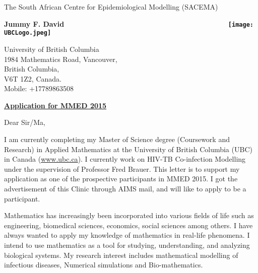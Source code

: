 \documentclass{letter} %
\begin{document}
\signature{Jummy Funke David \href{mailto: jummy@aims.ac.za}{jummy@aims.ac.za} }           %
\longindentation=0pt                       %
\let\raggedleft\raggedright                %
 
\begin{letter}{The South African Centre for Epidemiological Modelling (SACEMA)}

\begin{flushleft}
{\large\bf Jummy F. David $\qquad \qquad \qquad \qquad \qquad \qquad \qquad \qquad \qquad \qquad \qquad \  \ \  \ ${\texttt{[image: UBCLogo.jpeg]}}}
\end{flushleft}

\begin{flushright}
\hfill University of British Columbia\\
\hfill 1984 Mathematics Road, Vancouver,\\
\hfill British Columbia,\\
\hfill V6T 1Z2, Canada.\\
\hfill Mobile: +17789863508
\end{flushright} 
\vfill %
 
\opening{} 

\begin{center}
{\bf{\underline{Application for MMED 2015}}}
\end{center}
Dear Sir/Ma,

\noindent I am currently completing my Master of Science degree (Coursework and Research) in Applied Mathematics at the University of British Columbia (UBC) in Canada (\href{http://www.ubc.ca}{www.ubc.ca}). I currently work on HIV-TB Co-infection Modelling under the supervision of Professor Fred Brauer. This letter is to support my application as one of the prospective participants in MMED 2015. I got the advertisement of this Clinic through AIMS mail, and will like to apply to be a participant.


\noindent Mathematics has increasingly been incorporated into various fields of life such as engineering, biomedical sciences, economics, social sciences among others. I have always wanted to apply my knowledge of mathematics in real-life phenomena. I intend to use mathematics as a tool for studying, understanding, and analyzing biological systems. My research interest includes mathematical modelling of infectious diseases, Numerical simulations and Bio-mathematics.


\end{letter}
\end{document}
